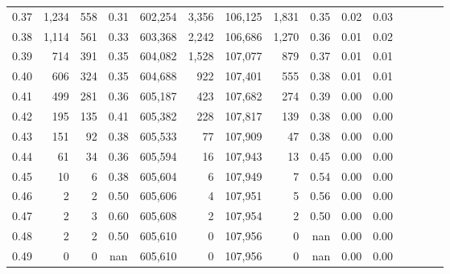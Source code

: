 \begin{tabular}{rrrcrrrrrrrrrrr}
0.37 &   1,234 &    558 &                                       0.31 &  602,254 &    3,356 &  106,125 &    1,831 &  0.35 &  0.02 &                         0.03 \\
0.38 &   1,114 &    561 &                                       0.33 &  603,368 &    2,242 &  106,686 &    1,270 &  0.36 &  0.01 &                         0.02 \\
0.39 &     714 &    391 &                                       0.35 &  604,082 &    1,528 &  107,077 &      879 &  0.37 &  0.01 &                         0.01 \\
0.40 &     606 &    324 &                                       0.35 &  604,688 &      922 &  107,401 &      555 &  0.38 &  0.01 &                         0.01 \\
0.41 &     499 &    281 &                                       0.36 &  605,187 &      423 &  107,682 &      274 &  0.39 &  0.00 &                         0.00 \\
0.42 &     195 &    135 &                                       0.41 &  605,382 &      228 &  107,817 &      139 &  0.38 &  0.00 &                         0.00 \\
0.43 &     151 &     92 &                                       0.38 &  605,533 &       77 &  107,909 &       47 &  0.38 &  0.00 &                         0.00 \\
0.44 &      61 &     34 &                                       0.36 &  605,594 &       16 &  107,943 &       13 &  0.45 &  0.00 &                         0.00 \\
0.45 &      10 &      6 &                                       0.38 &  605,604 &        6 &  107,949 &        7 &  0.54 &  0.00 &                         0.00 \\
0.46 &       2 &      2 &                                       0.50 &  605,606 &        4 &  107,951 &        5 &  0.56 &  0.00 &                         0.00 \\
0.47 &       2 &      3 &                                       0.60 &  605,608 &        2 &  107,954 &        2 &  0.50 &  0.00 &                         0.00 \\
0.48 &       2 &      2 &                                       0.50 &  605,610 &        0 &  107,956 &        0 &   nan &  0.00 &                         0.00 \\
0.49 &       0 &      0 &                                        nan &  605,610 &        0 &  107,956 &        0 &   nan &  0.00 &                         0.00 \\

\end{tabular}
